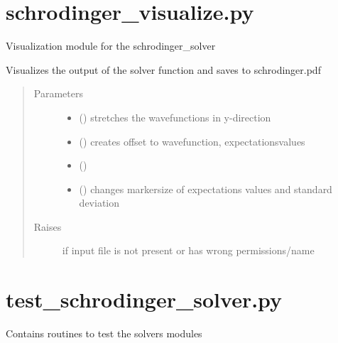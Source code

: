 \documentclass[letterpaper,10pt,english]{sphinxmanual}
\begin{document}
\section{schrodinger\_visualize.py}
\label{\detokenize{index:module-schrodinger_visualize}}\label{\detokenize{index:schrodinger-visualize-py}}
Visualization module for the schrodinger\_solver

\begin{fulllineitems}
\label{\detokenize{index:schrodinger_visualize.show}}
Visualizes the output of the solver function and saves to schrodinger.pdf
\begin{quote}\begin{description}
\item[{Parameters}] \leavevmode\begin{itemize}
\item {} 
 () \textendash{} stretches the wavefunctions in y-direction

\item {} 
 () \textendash{} creates offset to wavefunction, expectationsvalues

\item {} 
 () \textendash{} 

\item {} 
 () \textendash{} changes markersize of expectations values and standard deviation

\end{itemize}

\item[{Raises}] \leavevmode
{} \textendash{} if input file is not present or has wrong permissions/name

\end{description}\end{quote}

\end{fulllineitems}



\section{test\_schrodinger\_solver.py}
\label{\detokenize{index:test-schrodinger-solver-py}}\label{\detokenize{index:module-test_schrodinger_solver}}
Contains routines to test the solvers modules
\end{document}
